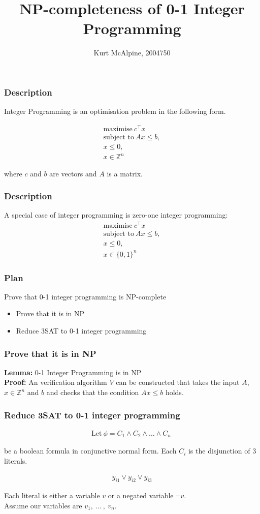 \documentclass[mathserif]{beamer}
\title{NP-completeness of 0-1 Integer Programming}
\author{Kurt McAlpine, 2004750}
\begin{document}
\frame{\titlepage}

\begin{frame}
\frametitle{Description}
Integer Programming is an optimisation problem in the following form.

\begin{align*}
\text{maximise}\ c^\top x\\
\text{subject to}\ Ax \leq b,\\
x \leq 0,\\
x \in \mathbb{Z}^n
\end{align*}

where $c$ and $b$ are vectors and $A$ is a matrix.

\end{frame}

\begin{frame}
\frametitle{Description}
A special case of integer programming is zero-one integer programming:
\begin{align*}
\text{maximise}\ c^\top x\\
\text{subject to}\ Ax \leq b,\\
x \leq 0,\\
x \in \{0, 1\}^n
\end{align*}
\end{frame}

\begin{frame}
\frametitle{Plan}
Prove that 0-1 integer programming is NP-complete
\begin{itemize}
\item Prove that it is in NP
\item Reduce 3SAT to 0-1 integer programming
\end{itemize}
\end{frame}

\begin{frame}
\frametitle{Prove that it is in NP}
\textbf{Lemma:} 0-1 Integer Programming is in NP\\
\textbf{Proof:} An verification algorithm $V$ can be constructed that takes the input $A$, $x \in \mathbb{Z}^n$ and $b$
and checks that the condition $Ax \leq b$ holds.
\end{frame}

\begin{frame}
\frametitle{Reduce 3SAT to 0-1 integer programming}
\begin{align*}
\text{Let}\ \phi = C_1 \wedge C_2 \wedge \ldots \wedge C_n\
\end{align*}
\begin{center}
be a boolean formula in conjunctive normal form. Each $C_i$ is the disjunction of 3 literals.
\end{center}
\begin{align*}
y_{i1} \vee y_{i2} \vee y_{i3}
\end{align*}

\begin{center}
Each literal is either a variable $v$ or a negated variable $\neg v$.\\

Assume our variables are $v_1,\ \ldots\ ,\ v_n$.
\end{center}

\end{frame}
\end{document}
